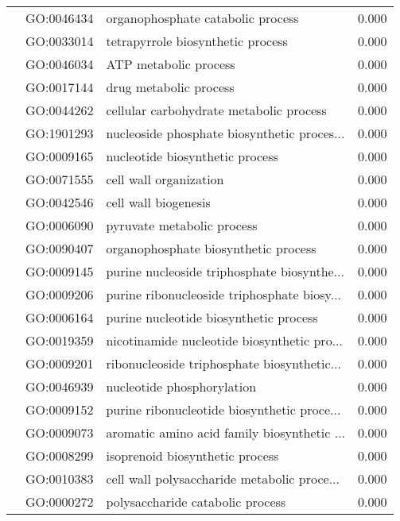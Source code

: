 \begin{longtable}{lllr}
   & GO:0046434 &            organophosphate catabolic process &         0.000 \\
   & GO:0033014 &            tetrapyrrole biosynthetic process &         0.000 \\
   & GO:0046034 &                        ATP metabolic process &         0.000 \\
   & GO:0017144 &                       drug metabolic process &         0.000 \\
   & GO:0044262 &      cellular carbohydrate metabolic process &         0.000 \\
   & GO:1901293 &  nucleoside phosphate biosynthetic proces... &         0.000 \\
   & GO:0009165 &              nucleotide biosynthetic process &         0.000 \\
   & GO:0071555 &                       cell wall organization &         0.000 \\
   & GO:0042546 &                         cell wall biogenesis &         0.000 \\
   & GO:0006090 &                   pyruvate metabolic process &         0.000 \\
   & GO:0090407 &         organophosphate biosynthetic process &         0.000 \\
   & GO:0009145 &  purine nucleoside triphosphate biosynthe... &         0.000 \\
   & GO:0009206 &  purine ribonucleoside triphosphate biosy... &         0.000 \\
   & GO:0006164 &       purine nucleotide biosynthetic process &         0.000 \\
   & GO:0019359 &  nicotinamide nucleotide biosynthetic pro... &         0.000 \\
   & GO:0009201 &  ribonucleoside triphosphate biosynthetic... &         0.000 \\
   & GO:0046939 &                   nucleotide phosphorylation &         0.000 \\
   & GO:0009152 &  purine ribonucleotide biosynthetic proce... &         0.000 \\
   & GO:0009073 &  aromatic amino acid family biosynthetic ... &         0.000 \\
   & GO:0008299 &              isoprenoid biosynthetic process &         0.000 \\
   & GO:0010383 &  cell wall polysaccharide metabolic proce... &         0.000 \\
   & GO:0000272 &             polysaccharide catabolic process &         0.000 \\

\end{longtable}
